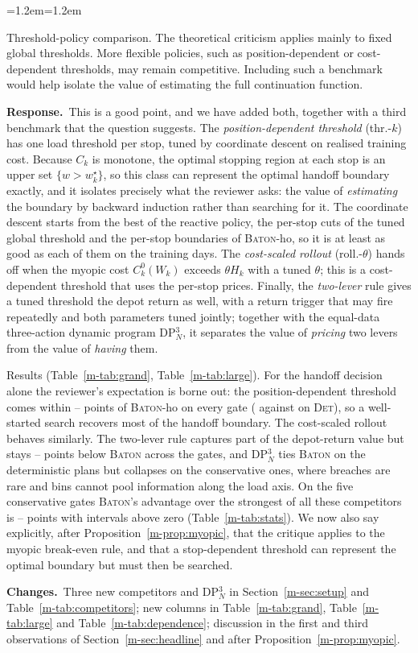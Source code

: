 \documentclass[11pt]{article}
\newenvironment{comment}{\par\medskip\noindent\color{rev}\itshape
  \begin{list}{}{\leftmargin=1.2em\rightmargin=1.2em}\item[]}%
  {\end{list}\par}
\newcommand{\resp}{\par\noindent\textbf{Response.}\ }
\newcommand{\chg}{\par\noindent\textbf{Changes.}\ }
\newcommand{\sref}[1]{Section~\ref{m-#1}}
\newcommand{\tref}[1]{Table~\ref{m-#1}}
\newcommand{\pref}[1]{Proposition~\ref{m-#1}}
\newcommand{\BATON}{\textsc{Baton}}
\begin{document}
\begin{comment}
Threshold-policy comparison. The theoretical criticism applies mainly
to fixed global thresholds. More flexible policies, such as
position-dependent or cost-dependent thresholds, may remain
competitive. Including such a benchmark would help isolate the value of
estimating the full continuation function.
\end{comment}
\resp This is a good point, and we have added both, together with a
third benchmark that the question suggests. The
\emph{position-dependent threshold} (thr.-$k$) has one load threshold
per stop, tuned by coordinate descent on realised training cost.
Because $C_k$ is monotone, the optimal stopping region at each stop is
an upper set $\{w > w_k^\star\}$, so this class can represent the
optimal handoff boundary exactly, and it isolates precisely what the
reviewer asks: the value of \emph{estimating} the boundary by backward
induction rather than searching for it. The coordinate descent starts
from the best of the reactive policy, the per-stop cuts of the tuned
global threshold and the per-stop boundaries of \BATON-ho, so it is at
least as good as each of them on the training days. The
\emph{cost-scaled rollout} (roll.-$\theta$) hands off when the myopic
cost $C^0_k(W_k)$ exceeds $\theta H_k$ with a tuned $\theta$; this is a
cost-dependent threshold that uses the per-stop prices. Finally, the
\emph{two-lever} rule gives a tuned threshold the depot return as well,
with a return trigger that may fire repeatedly and both parameters tuned
jointly; together with the equal-data three-action dynamic program
DP$^3_N$, it separates the value of \emph{pricing} two levers from the
value of \emph{having} them.

Results (\tref{tab:grand}, \tref{tab:large}). For the handoff decision
alone the reviewer's expectation is borne out: the position-dependent
threshold comes within \thrkHoGapMin--\thrkHoGapMax{} points of
\BATON-ho on every gate (\svDetThrK{} against \svDetHo{} on
\textsc{Det}), so a well-started search recovers most of the handoff
boundary. The cost-scaled rollout behaves similarly. The two-lever rule
captures part of the depot-return value but stays
\twoGapLo--\twoGapHi{} points below \BATON{} across the gates, and
DP$^3_N$ ties \BATON{} on the deterministic plans but collapses on the
conservative ones, where breaches are rare and bins cannot pool
information along the load axis. On the five conservative gates
\BATON's advantage over the strongest of all these competitors is
\statConsDeltaMin--\statConsDeltaMax{} points with intervals above zero
(\tref{tab:stats}). We now also say explicitly, after
\pref{prop:myopic}, that the critique applies to the myopic break-even
rule, and that a stop-dependent threshold can represent the optimal
boundary but must then be searched.
\chg Three new competitors and DP$^3_N$ in \sref{sec:setup} and
\tref{tab:competitors}; new columns in \tref{tab:grand},
\tref{tab:large} and \tref{tab:dependence}; discussion in the first and
third observations of \sref{sec:headline} and after
\pref{prop:myopic}.
\end{document}
